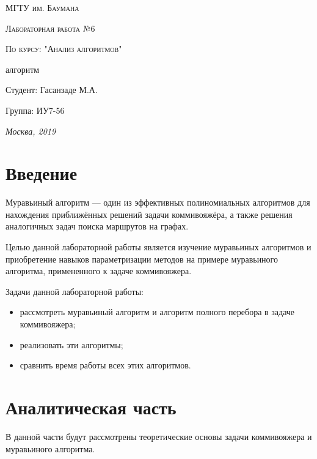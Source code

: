 \documentclass[12pt]{report}
\begin{document}
\begin{titlepage}
	\centering
	{\scshape\LARGE МГТУ им. Баумана \par}
	\vspace{3cm}
	{\scshape\Large Лабораторная работа №6\par}
	\vspace{0.5cm}	
	{\scshape\Large По курсу: "Анализ алгоритмов"\par}
	\vspace{1.5cm}
	{\huge{} алгоритм\par}
	\vspace{2cm}
	\Large Студент: Гасанзаде М.А.\par
	\vspace{0.5cm}
	\Large Группа: ИУ7-56\par
	\vspace{0.5cm}

	\vfill
	\large \textit {Москва, 2019} \par
\end{titlepage}

\tableofcontents

\newpage
\chapter*{Введение}
Муравьиный алгоритм — один из эффективных полиномиальных алгоритмов для нахождения приближённых решений задачи коммивояжёра, а также решения аналогичных задач поиска маршрутов на графах.
        
Целью данной лабораторной работы является изучение муравьиных алгоритмов и приобретение навыков параметризации методов на примере муравьиного алгоритма, примененного к задаче коммивояжера.
        
Задачи данной лабораторной работы:
\begin{itemize}
	\item рассмотреть муравьиный алгоритм и алгоритм полного перебора в задаче коммивояжера;
	\item реализовать эти алгоритмы;
	\item сравнить время работы всех этих алгоритмов.
\end{itemize}



\chapter{Аналитическая часть}
В данной части будут рассмотрены теоретические основы задачи коммивояжера и муравьиного алгоритма. 
		
\end{document}

